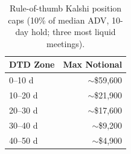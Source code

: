 \begin{table}[h]
    \centering
    \caption{Rule-of-thumb Kalshi position caps (10\% of median ADV,
             10-day hold; three most liquid meetings).}
    \label{tab:kalshi-caps}
    \begin{tabular}{lr}
        \toprule
        \textbf{DTD Zone} & \textbf{Max Notional} \\
        \midrule
         0--10 d & $\sim$\$59,600 \\
        10--20 d & $\sim$\$21,900 \\
        20--30 d & $\sim$\$17,600 \\
        30--40 d & $\sim$\$9,200  \\
        40--50 d & $\sim$\$4,900  \\
        \bottomrule
    \end{tabular}
\end{table}
